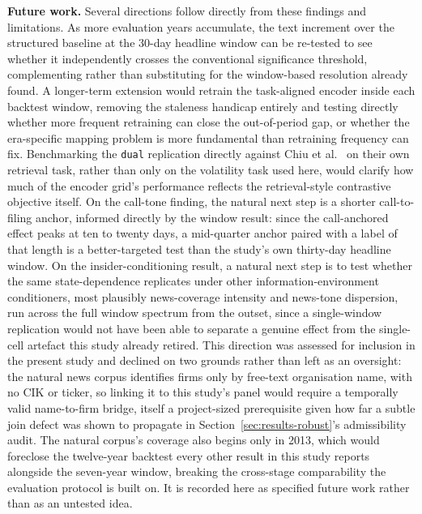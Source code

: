 \documentclass[logo,msc,ai]{infthesis}        %
\begin{document}
\textbf{Future work.} Several directions follow directly from these findings and limitations. As more evaluation years accumulate, the text increment over the structured baseline at the 30-day headline window can be re-tested to see whether it independently crosses the conventional significance threshold, complementing rather than substituting for the window-based resolution already found. A longer-term extension would retrain the task-aligned encoder inside each backtest window, removing the staleness handicap entirely and testing directly whether more frequent retraining can close the out-of-period gap, or whether the era-specific mapping problem is more fundamental than retraining frequency can fix. Benchmarking the \texttt{dual} replication directly against Chiu et al.\ \cite{chiu2025financial} on their own retrieval task, rather than only on the volatility task used here, would clarify how much of the encoder grid's performance reflects the retrieval-style contrastive objective itself. On the call-tone finding, the natural next step is a shorter call-to-filing anchor, informed directly by the window result: since the call-anchored effect peaks at ten to twenty days, a mid-quarter anchor paired with a label of that length is a better-targeted test than the study's own thirty-day headline window. On the insider-conditioning result, a natural next step is to test whether the same state-dependence replicates under other information-environment conditioners, most plausibly news-coverage intensity and news-tone dispersion, run across the full window spectrum from the outset, since a single-window replication would not have been able to separate a genuine effect from the single-cell artefact this study already retired. This direction was assessed for inclusion in the present study and declined on two grounds rather than left as an oversight: the natural news corpus identifies firms only by free-text organisation name, with no CIK or ticker, so linking it to this study's panel would require a temporally valid name-to-firm bridge, itself a project-sized prerequisite given how far a subtle join defect was shown to propagate in Section~\ref{sec:results-robust}'s admissibility audit. The natural corpus's coverage also begins only in 2013, which would foreclose the twelve-year backtest every other result in this study reports alongside the seven-year window, breaking the cross-stage comparability the evaluation protocol is built on. It is recorded here as specified future work rather than as an untested idea.
\end{document}
